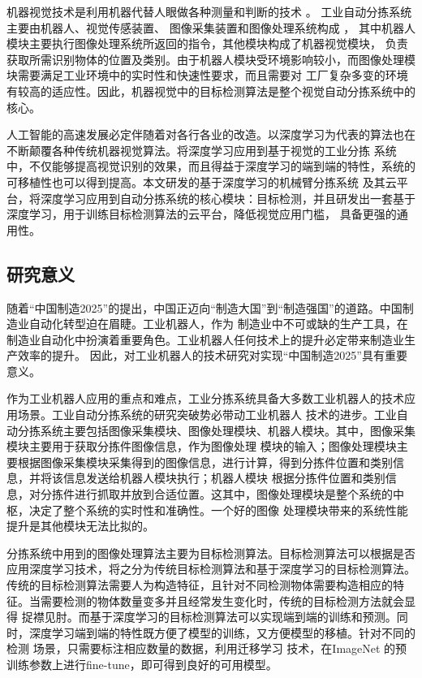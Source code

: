 机器视觉技术是利用机器代替人眼做各种测量和判断的技术    \cite{BZG:2015}。
工业自动分拣系统主要由机器人、视觉传感装置、
图像采集装置和图像处理系统构成  \cite{ZWH:2018}，
其中机器人模块主要执行图像处理系统所返回的指令，其他模块构成了机器视觉模块，
负责获取所需识别物体的位置及类别。由于机器人模块受环境影响较小，而图像处理模块需要满足工业环境中的实时性和快速性要求，而且需要对
工厂复杂多变的环境有较高的适应性。因此，机器视觉中的目标检测算法是整个视觉自动分拣系统中的核心。

人工智能的高速发展必定伴随着对各行各业的改造。以深度学习为代表的算法也在不断颠覆各种传统机器视觉算法。将深度学习应用到基于视觉的工业分拣
系统中，不仅能够提高视觉识别的效果，而且得益于深度学习的端到端的特性，系统的可移植性也可以得到提高。本文研发的基于深度学习的机械臂分拣系统
及其云平台，将深度学习应用到自动分拣系统的核心模块：目标检测，并且研发出一套基于深度学习，用于训练目标检测算法的云平台，降低视觉应用门槛，
具备更强的通用性。

\subsection{研究意义}

随着“中国制造2025”的提出，中国正迈向“制造大国”到“制造强国”的道路。中国制造业自动化转型迫在眉睫。工业机器人，作为
制造业中不可或缺的生产工具，在制造业自动化中扮演着重要角色。工业机器人任何技术上的提升必定带来制造业生产效率的提升。
因此，对工业机器人的技术研究对实现“中国制造2025”具有重要意义。

作为工业机器人应用的重点和难点，工业分拣系统具备大多数工业机器人的技术应用场景。工业自动分拣系统的研究突破势必带动工业机器人
技术的进步。工业自动分拣系统主要包括图像采集模块、图像处理模块、机器人模块。其中，图像采集模块主要用于获取分拣件图像信息，作为图像处理
模块的输入；图像处理模块主要根据图像采集模块采集得到的图像信息，进行计算，得到分拣件位置和类别信息，并将该信息发送给机器人模块执行；机器人模块
根据分拣件位置和类别信息，对分拣件进行抓取并放到合适位置。这其中，图像处理模块是整个系统的中枢，决定了整个系统的实时性和准确性。一个好的图像
处理模块带来的系统性能提升是其他模块无法比拟的。

分拣系统中用到的图像处理算法主要为目标检测算法。目标检测算法可以根据是否应用深度学习技术，将之分为传统目标检测算法和基于深度学习的目标检测算法。
传统的目标检测算法需要人为构造特征，且针对不同检测物体需要构造相应的特征。当需要检测的物体数量变多并且经常发生变化时，传统的目标检测方法就会显得
捉襟见肘。而基于深度学习的目标检测算法可以实现端到端的训练和预测。同时，深度学习端到端的特性既方便了模型的训练，又方便模型的移植。针对不同的检测
场景，只需要标注相应数量的数据，利用迁移学习    \cite{TransferL:2010}
技术，在ImageNet  \cite{ImageNet:2009}
的预训练参数上进行fine-tune，即可得到良好的可用模型。

